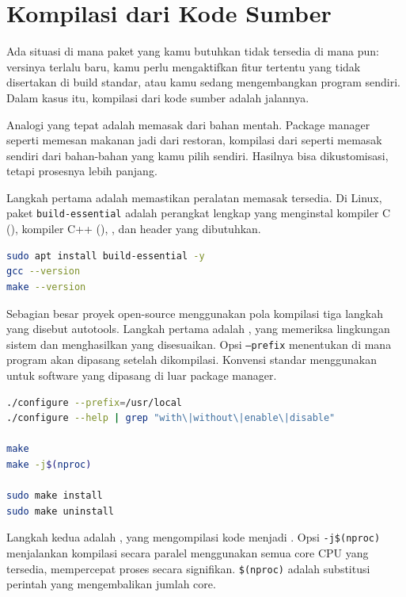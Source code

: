 \section{Kompilasi dari Kode Sumber}
\label{sec:compile-from-source}

Ada situasi di mana paket yang kamu butuhkan tidak tersedia di  mana
pun: versinya terlalu baru, kamu perlu mengaktifkan fitur tertentu yang tidak
disertakan di build standar, atau kamu sedang mengembangkan program sendiri.
Dalam kasus itu, kompilasi dari kode sumber adalah jalannya.

Analogi yang tepat adalah memasak dari bahan mentah. Package manager seperti
memesan makanan jadi dari restoran, kompilasi dari  seperti memasak sendiri
dari bahan-bahan yang kamu pilih sendiri. Hasilnya bisa dikustomisasi, tetapi
prosesnya lebih panjang.

Langkah pertama adalah memastikan peralatan memasak tersedia. Di Linux, paket
\texttt{build-essential} adalah perangkat lengkap yang menginstal kompiler C
(), kompiler C++ (), , dan header yang dibutuhkan.

\begin{lstlisting}[language=bash, caption={Instalasi build tools}]
sudo apt install build-essential -y
gcc --version
make --version
\end{lstlisting}

Sebagian besar proyek open-source menggunakan pola kompilasi tiga langkah yang
disebut autotools. Langkah pertama adalah , yang memeriksa
lingkungan sistem dan menghasilkan  yang disesuaikan. Opsi
\texttt{--prefix} menentukan di mana program akan dipasang setelah dikompilasi.
Konvensi standar menggunakan  untuk software yang dipasang di
luar package manager.

\begin{lstlisting}[language=bash, caption={Pola kompilasi autotools}]
./configure --prefix=/usr/local
./configure --help | grep "with\|without\|enable\|disable"

make
make -j$(nproc)

sudo make install
sudo make uninstall
\end{lstlisting}

Langkah kedua adalah , yang mengompilasi kode menjadi . Opsi
\texttt{-j\$(nproc)} menjalankan kompilasi secara paralel menggunakan semua
core CPU yang tersedia, mempercepat proses secara signifikan. \texttt{\$(nproc)}
adalah substitusi perintah yang mengembalikan jumlah core.

